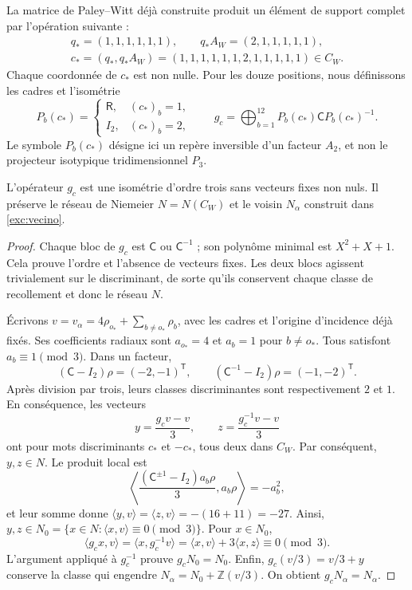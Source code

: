 La matrice de Paley--Witt déjà construite produit un élément de support
complet par l'opération suivante :
\begin{equation}
 \begin{gathered}
 q_*=(1,1,1,1,1,1),\qquad q_*A_W=(2,1,1,1,1,1),\\
 c_*=(q_*,q_*A_W)
 =(1,1,1,1,1,1,2,1,1,1,1,1)\in C_W.
 \end{gathered}
 \label{km:palabra-total}
\end{equation}
Chaque coordonnée de \(c_*\) est non nulle. Pour les douze positions,
nous définissons les cadres et l'isométrie
\begin{equation}
 P_b(c_*)=
 \begin{cases}\mathsf R,&(c_*)_b=1,\\I_2,&(c_*)_b=2,\end{cases}
 \qquad
 g_c=\bigoplus_{b=1}^{12}P_b(c_*)\mathsf C P_b(c_*)^{-1}.
 \label{km:isometria-ternaria}
\end{equation}
Le symbole \(P_b(c_*)\) désigne ici un repère inversible d'un facteur \(A_2\), et non le projecteur isotypique tridimensionnel \(P_3\).

\begin{proposition}
\label{km:estabilidad-vecino}
L'opérateur \(g_c\) est une isométrie d'ordre trois sans vecteurs fixes non nuls. Il préserve le réseau de Niemeier \(N=N(C_W)\) et le voisin \(N_\alpha\) construit dans \eqref{exc:vecino}.
\end{proposition}
\begin{proof}
Chaque bloc de \(g_c\) est \(\mathsf C\) ou \(\mathsf C^{-1}\) ;
son polynôme minimal est \(X^2+X+1\). Cela prouve l'ordre et
l'absence de vecteurs fixes. Les deux blocs agissent trivialement sur le
discriminant, de sorte qu'ils conservent chaque classe de recollement et donc
le réseau \(N\).

Écrivons \(v=v_\alpha=4\rho_{o_*}+\sum_{b\ne o_*}\rho_b\),
avec les cadres et l'origine d'incidence déjà fixés. Ses coefficients
radiaux sont \(a_{o_*}=4\) et \(a_b=1\) pour \(b\ne o_*\).
Tous satisfont \(a_b\equiv1\pmod3\). Dans un facteur,
\[
 (\mathsf C-I_2)\rho=(-2,-1)^{\mathsf T},\qquad
 (\mathsf C^{-1}-I_2)\rho=(-1,-2)^{\mathsf T}.
\]
Après division par trois, leurs classes discriminantes sont respectivement \(2\) et \(1\). En conséquence, les vecteurs
\begin{equation}
 y=\frac{g_cv-v}{3},\qquad z=\frac{g_c^{-1}v-v}{3}
 \label{km:desplazamientos}
\end{equation}
ont pour mots discriminants \(c_*\) et \(-c_*\), tous deux dans
\(C_W\). Par conséquent, \(y,z\in N\). Le produit local est
\[
 \left\langle
 \frac{(\mathsf C^{\pm1}-I_2)a_b\rho}{3},a_b\rho
 \right\rangle=-a_b^2,
\]
et leur somme donne \(\langle y,v\rangle=\langle z,v\rangle=-(16+11)=-27\). Ainsi, \(y,z\in N_0=\{x\in N:\langle x,v\rangle\equiv0\pmod3\}\). Pour \(x\in N_0\),
\[
 \langle g_cx,v\rangle
 =\langle x,g_c^{-1}v\rangle
 =\langle x,v\rangle+3\langle x,z\rangle\equiv0\pmod3.
\]
L'argument appliqué à \(g_c^{-1}\) prouve \(g_cN_0=N_0\).
Enfin, \(g_c(v/3)=v/3+y\) conserve la classe qui engendre
\(N_\alpha=N_0+\mathbb Z(v/3)\). On obtient
\(g_cN_\alpha=N_\alpha\).
\end{proof}


